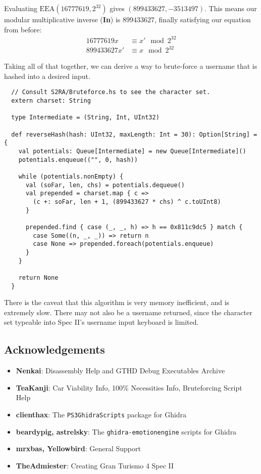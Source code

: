 \documentclass[14pt,a4paper,notitlepage]{extarticle}
\begin{document}
                Evaluating $\text{EEA}(16777619, 2^{32})$ gives $(899433627,-3513497)$.
                This means our modular multiplicative inverse (\textbf{In}) is $899433627$, finally
                satisfying our equation from before:
                \begin{align*}
                    16777619x &\equiv x' \mod 2^{32}\\
                    899433627 x' &\equiv x \mod 2^{32}
                \end{align*}

                \noindent Taking all of that together, we can derive a way to brute-force a username
                that is hashed into a desired input.
                \pagebreak
                \begin{lstlisting}
  // Consult S2RA/Bruteforce.hs to see the character set.
  extern charset: String

  type Intermediate = (String, Int, UInt32)

  def reverseHash(hash: UInt32, maxLength: Int = 30): Option[String] = {
    val potentials: Queue[Intermediate] = new Queue[Intermediate]()
    potentials.enqueue(("", 0, hash))

    while (potentials.nonEmpty) {
      val (soFar, len, chs) = potentials.dequeue()
      val prepended = charset.map { c =>
        (c +: soFar, len + 1, (899433627 * chs) ^ c.toUInt8)
      }

      prepended.find { case (_, _, h) => h == 0x811c9dc5 } match {
        case Some((n, _, _)) => return n
        case None => prepended.foreach(potentials.enqueue)
      }
    }

    return None
  }
                \end{lstlisting}

                \noindent There is the caveat that this algorithm is very memory inefficient, and
                is extremely slow. There may not also be a username returned, since the character
                set typeable into Spec II's username input keyboard is limited.

        \subsection*{Acknowledgements}
            \small{
                \begin{itemize}
                    \item \textbf{Nenkai}: Disassembly Help and GTHD Debug Executables Archive
                    \item \textbf{TeaKanji}: Car Viability Info, 100\% Necessities Info,
                    Bruteforcing Script Help
                    \item \textbf{clienthax}: The \texttt{PS3GhidraScripts} package for Ghidra
                    \item \textbf{beardypig, astrelsky}: The \texttt{ghidra-emotionengine} scripts
                    for Ghidra
                    \item \textbf{mrxbas, Yellowbird}: General Support
                    \item \textbf{TheAdmiester}: Creating Gran Turismo 4 Spec II
                \end{itemize}
            }
\end{document}
